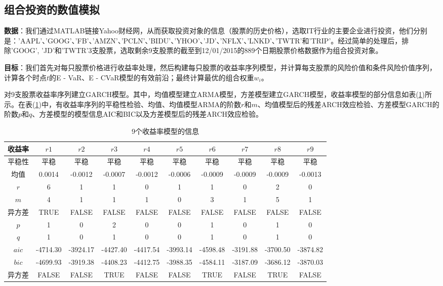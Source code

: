     \subsection{组合投资的数值模拟}
        \par
        \textbf{数据}：我们通过MATLAB链接Yahoo财经网，从而获取投资对象的信息（股票的历史价格），选取IT行业的主要企业进行投资，他们分别是：'AAPL'、'GOOG'、'FB'、'AMZN'、'PCLN'、'BIDU'、'YHOO'、'JD'、'NFLX'、'LNKD'、'TWTR'和'TRIP'。经过简单的处理后，排除'GOOG', 'JD'和'TWTR'3支股票，选取剩余9支股票的截至到12/01/2015的889个日期股票价格数据作为组合投资对象。
        \par
        \textbf{目标}：我们首先对每只股票价格进行收益率处理，然后构建每只股票的收益率序列模型，并计算每支股票的风险价值和条件风险价值序列，计算各个时点$t$的E - VaR、E - CVaR模型的有效前沿；最终计算最优的组合权重$w_i$。
        \par
        对9支股票收益率序列建立GARCH模型。其中，均值模型建立ARMA模型，方差模型建立GARCH模型，收益率模型的部分信息如表(\ref{9个收益率模型的信息})所示。在表(\ref{9个收益率模型的信息})中，有收益率序列的平稳性检验、均值、均值模型ARMA的阶数$r$和$m$、均值模型后的残差ARCH效应检验、方差模型GARCH的阶数$p$和$q$、方差模型的模型信息AIC和BIC以及方差模型后的残差ARCH效应检验。
        \begin{table}[H]
        \footnotesize
        \caption{9个收益率模型的信息}
        \label{9个收益率模型的信息}
        \centering
        \begin{tabular}{c|ccccccccc}
            \toprule
            收益率 &$r1$ & $r2$&  $r3$ & $r4$ & $r5$ & $r6$ & $r7$ & $r8$ & $r9$\\
            \midrule
            平稳性 &平稳 & 平稳 & 平稳 & 平稳 & 平稳 & 平稳 & 平稳 & 平稳 & 平稳\\
            均值 & 0.0014  &-0.0012& -0.0007 &-0.0012& -0.0006& -0.0009& -0.0009 &-0.0009& -0.0013\\
            $r$ &  6  & 1  & 1  & 0  & 1  & 1 &  0  & 2  & 0\\
            $m$ &  4  & 1  & 1  & 1  & 0   &3 &  1  & 5  & 1\\
            异方差 &TRUE  &  FALSE  & FALSE &  FALSE &  FALSE  & FALSE  & FALSE  & FALSE &  FALSE\\
            $p$ &  1 &  0  & 2 &  0  & 0 &  1  & 0  & 1 &  0\\
            $q$  & 1  & 0  & 1  & 0  & 0 &  1  & 0  & 1  & 0\\
            $aic$& -4714.30 &   -3924.17 &   -4427.40 &   -4417.54  &  -3993.14&    -4598.48 &   -3191.88   & -3700.50 &   -3874.82\\
            $bic$ &-4699.93   & -3919.38   & -4408.23 &   -4412.75  &  -3988.35  &  -4584.11   & -3187.09   & -3686.12  &  -3870.03\\
            异方差 &FALSE  & FALSE  & TRUE  &  FALSE  & FALSE  & TRUE  &  FALSE  & TRUE &   FALSE\\
            \bottomrule
        \end{tabular}
        \end{table}
